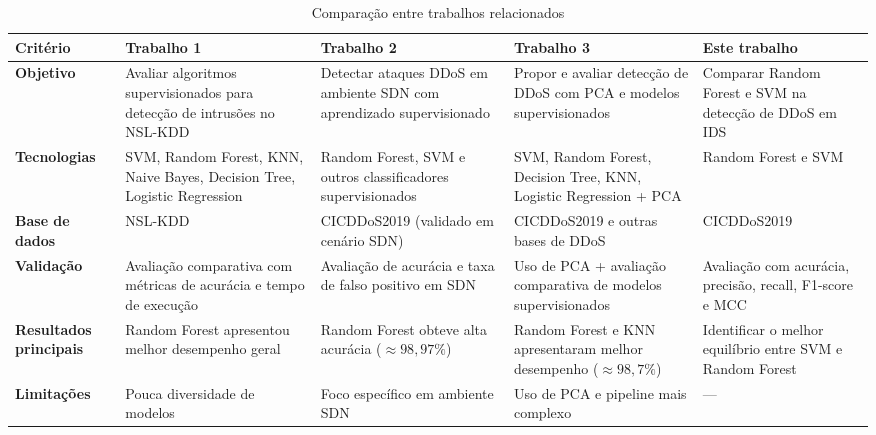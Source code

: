 \documentclass[
    12pt,                %
    openright,           %
    oneside,             %
    a4paper,             %
    english,             %
    brazil               %
]{abntex2}
\begin{document}
\vspace{0.5cm}

\begin{table}[htb]
    \centering
    \caption{Comparação entre trabalhos relacionados}
    \label{tab:trabalhos_relacionados}
    
    \renewcommand{\arraystretch}{1.3}
    
    \begin{tabularx}{\textwidth}{p{3cm}|X|X|X|X}
        \toprule
        \textbf{Critério} & \textbf{Trabalho 1} & \textbf{Trabalho 2} & \textbf{Trabalho 3} & \textbf{Este trabalho} \\
        \midrule
        
        \textbf{Objetivo}           
        & Avaliar algoritmos supervisionados para detecção de intrusões no NSL-KDD
        & Detectar ataques DDoS em ambiente SDN com aprendizado supervisionado
        & Propor e avaliar detecção de DDoS com PCA e modelos supervisionados
        & Comparar Random Forest e SVM na detecção de DDoS em IDS
        \\
        \midrule
        
        \textbf{Tecnologias}         
        & SVM, Random Forest, KNN, Naive Bayes, Decision Tree, Logistic Regression
        & Random Forest, SVM e outros classificadores supervisionados
        & SVM, Random Forest, Decision Tree, KNN, Logistic Regression + PCA
        & Random Forest e SVM
        \\
        \midrule
        
        \textbf{Base de dados}          
        & NSL-KDD
        & CICDDoS2019 (validado em cenário SDN)
        & CICDDoS2019 e outras bases de DDoS
        & CICDDoS2019
        \\
        \midrule
        
        \textbf{Validação}          
        & Avaliação comparativa com métricas de acurácia e tempo de execução
        & Avaliação de acurácia e taxa de falso positivo em SDN
        & Uso de PCA + avaliação comparativa de modelos supervisionados
        & Avaliação com acurácia, precisão, recall, F1-score e MCC
        \\
        \midrule
        
        \textbf{Resultados principais}          
        & Random Forest apresentou melhor desempenho geral
        & Random Forest obteve alta acurácia ($\approx 98{,}97\%$)
        & Random Forest e KNN apresentaram melhor desempenho ($\approx 98{,}7\%$)
        & Identificar o melhor equilíbrio entre SVM e Random Forest
        \\
        \midrule
        
        \textbf{Limitações}          
        & Pouca diversidade de modelos
        & Foco específico em ambiente SDN
        & Uso de PCA e pipeline mais complexo
        & ---
        \\
        
        \bottomrule
    \end{tabularx}
    
\end{table}
\end{document}
